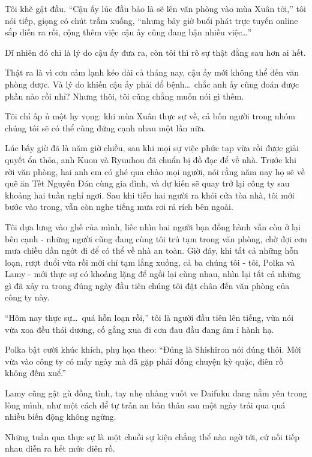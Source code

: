 \documentclass[../main.tex]{subfiles}
\begin{document}
Tôi khẽ gật đầu. ``Cậu ấy lúc đầu bảo là sẽ lên văn phòng vào mùa Xuân tới,'' tôi nói tiếp, giọng có chút trầm xuống, ``nhưng bây giờ buổi phát trực tuyến online sắp diễn ra rồi, cộng thêm việc cậu ấy cũng đang bận nhiều việc\dots''

Dĩ nhiên đó chỉ là lý do cậu ấy đưa ra, còn tôi thì rõ sự thật đằng sau hơn ai hết.

Thật ra là vì cơn cảm lạnh kéo dài cả tháng nay, cậu ấy mới không thể đến văn phòng được. Và lý do khiến cậu ấy phải đổ bệnh\dots\ chắc anh ấy cũng đoán được phần nào rồi nhỉ? Nhưng thôi, tôi cũng chẳng muốn nói gì thêm.

Tôi chỉ ấp ủ một hy vọng: khi mùa Xuân thực sự về, cả bốn người trong nhóm chúng tôi sẽ có thể cùng đứng cạnh nhau một lần nữa.

\il

Lúc bấy giờ đã là năm giờ chiều, sau khi mọi sự việc phức tạp vừa rồi được giải quyết ổn thỏa, anh Kuon và Ryuuhou đã chuẩn bị đồ đạc để về nhà. Trước khi rời văn phòng, hai anh em có ghé qua chào mọi người, nói rằng năm nay họ sẽ về quê ăn Tết Nguyên Đán cùng gia đình, và dự kiến sẽ quay trở lại công ty sau khoảng hai tuần nghỉ ngơi. Sau khi tiễn hai người ra khỏi cửa tòa nhà, tôi mới bước vào trong, vẫn còn nghe tiếng mưa rơi rả rích bên ngoài.

Tôi dựa lưng vào ghế của mình, liếc nhìn hai người bạn đồng hành vẫn còn ở lại bên cạnh - những người cũng đang cùng tôi trú tạm trong văn phòng, chờ đợi cơn mưa chiều dần ngớt đi để có thể về nhà an toàn. Giờ đây, khi tất cả những hỗn loạn, rượt đuổi vừa rồi mới chỉ tạm lắng xuống, cả ba chúng tôi - tôi, Polka và Lamy - mới thực sự có khoảng lặng để ngồi lại cùng nhau, nhìn lại tất cả những gì đã xảy ra trong đúng ngày đầu tiên chúng tôi đặt chân đến văn phòng của công ty này.

``Hôm nay thực sự\dots\ quá hỗn loạn rồi,'' tôi là người đầu tiên lên tiếng, vừa nói vừa xoa đều thái dương, cố gắng xua đi cơn đau đầu đang âm ỉ hành hạ.

Polka bật cười khúc khích, phụ họa theo: ``Đúng là Shishiron nói đúng thôi. Mới vừa vào công ty có mấy ngày mà đã gặp phải đống chuyện kỳ quặc, điên rồ không đếm xuể.''

Lamy cũng gật gù đồng tình, tay nhẹ nhàng vuốt ve Daifuku đang nằm yên trong lòng mình, như một cách để tự trấn an bản thân sau một ngày trải qua quá nhiều biến động không ngừng.

Những tuần qua thực sự là một chuỗi sự kiện chẳng thể nào ngờ tới, cứ nối tiếp nhau diễn ra hết mức điên rồ.
\end{document}
